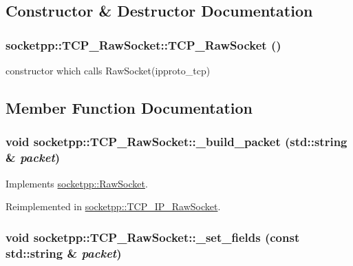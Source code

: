 \subsection{Constructor \& Destructor Documentation}
\hypertarget{classsocketpp_1_1TCP__RawSocket_f0b76c8fdc293bb5e22914b247b1e7b8}{
\subsubsection[{TCP\_\-RawSocket}]{\setlength{\rightskip}{0pt plus 5cm}socketpp::TCP\_\-RawSocket::TCP\_\-RawSocket ()}}
\label{classsocketpp_1_1TCP__RawSocket_f0b76c8fdc293bb5e22914b247b1e7b8}


constructor which calls RawSocket(ipproto\_\-tcp) 



\subsection{Member Function Documentation}
\hypertarget{classsocketpp_1_1TCP__RawSocket_d89a39d4bc91a76d0cb50da5cdd10fbc}{
\subsubsection[{\_\-build\_\-packet}]{\setlength{\rightskip}{0pt plus 5cm}void socketpp::TCP\_\-RawSocket::\_\-build\_\-packet (std::string \& {\em packet})}}
\label{classsocketpp_1_1TCP__RawSocket_d89a39d4bc91a76d0cb50da5cdd10fbc}




Implements \hyperlink{classsocketpp_1_1RawSocket_eb0a3f716c0fc46efa4123acf0fe1e66}{socketpp::RawSocket}.

Reimplemented in \hyperlink{classsocketpp_1_1TCP__IP__RawSocket_281508237add8a3c530bb0be0b6a1e7b}{socketpp::TCP\_\-IP\_\-RawSocket}.\hypertarget{classsocketpp_1_1TCP__RawSocket_6976a4726503eef03a8d446afdbaddbe}{
\subsubsection[{\_\-set\_\-fields}]{\setlength{\rightskip}{0pt plus 5cm}void socketpp::TCP\_\-RawSocket::\_\-set\_\-fields (const std::string \& {\em packet})}}
\label{classsocketpp_1_1TCP__RawSocket_6976a4726503eef03a8d446afdbaddbe}




